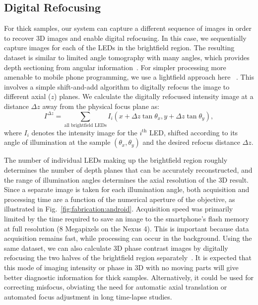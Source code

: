 \subsection{Digital Refocusing}
For thick samples, our system can capture a different sequence of images in order to recover 3D images and enable digital refocusing. In this case, we sequentially capture images for each of the LEDs in the brightfield region. The resulting dataset is similar to limited angle tomography with many angles, which provides depth sectioning from angular information~\cite{Kak:1988fk}. For simpler processing more amenable to mobile phone programming, we use a lightfield approach here ~\cite{Ng2005,Zheng2011}. This involves a simple shift-and-add algorithm to digitally refocus the image to different axial ($z$) planes. We calculate the digitally refocused intensity image at a distance $\Delta z$ away from the physical focus plane as:
\begin{equation}
I^{\Delta z} = \sum_{\text{all brightfield LEDs}}I_i(x+\Delta z\tan{\theta_x}, y+\Delta z\tan{\theta_y}),
\label{I_refocus}
\end{equation}
where $I_i$ denotes the intensity image for the $i^{\text{th}}$ LED, shifted according to its angle of illumination at the sample $(\theta_x,\theta_y)$ and the desired refocus distance $\Delta z$.

The number of individual LEDs making up the brightfield region roughly determines the number of depth planes that can be accurately reconstructed, and the range of illumination angles determines the axial resolution of the 3D result. Since a separate image is taken for each illumination angle, both acquisition and processing time are a function of the numerical aperture of the objective, as illustrated in Fig.~\ref{fig:fabrication:android}. Acquisition speed was primarily limited by the time required to save an image to the smartphone's flash memory at full resolution (8 Megapixels on the Nexus 4). This is important because data acquisition remains fast, while processing can occur in the background. Using the same dataset, we can also calculate 3D phase contrast images by digitally refocusing the two halves of the brightfield region separately~\cite{Tian14}. It is expected that this mode of imaging intensity or phase in 3D with no moving parts will give better diagnostic information for thick samples. Alternatively, it could be used for correcting misfocus, obviating the need for automatic axial translation or automated focus adjustment in long time-lapse studies.


